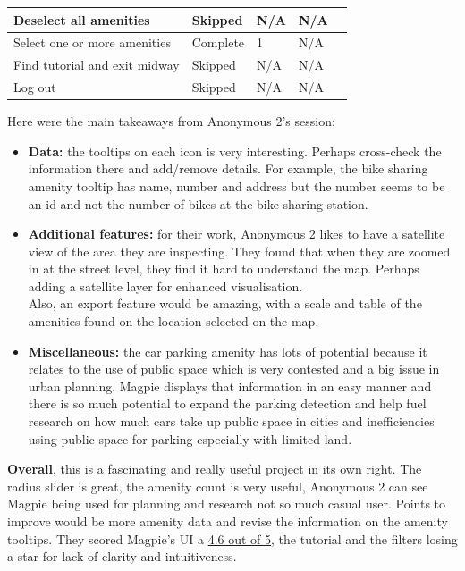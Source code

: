 \begin{table}[h!]
\begin{tabular}{|p{}|p{}|p{}|p{}|p{}|}
        \hline
        Deselect all amenities        & Skipped         & N/A                 & N/A                             \\
        \hline
        Select one or more amenities  & Complete        & 1                   & N/A                             \\
        \hline
        Find tutorial and exit midway & Skipped         & N/A                 & N/A                             \\
        \hline
        Log out                       & Skipped         & N/A                 & N/A                             \\
        \hline
    \end{tabular}
\end{table}

\newpage Here were the main takeaways from Anonymous 2's session:
\begin{itemize}
    \item \textbf{Data:} the tooltips on each icon is very interesting. Perhaps cross-check the information there and add/remove details. For example, the bike sharing amenity tooltip has name, number and address but the number seems to be an id and not the number of bikes at the bike sharing station.\\
    \item \textbf{Additional features:} for their work, Anonymous 2 likes to have a satellite view of the area they are inspecting. They found that when they are zoomed in at the street level, they find it hard to understand the map. Perhaps adding a satellite layer for enhanced visualisation.\\ Also, an export feature would be amazing, with a scale and table of the amenities found on the location selected on the map.\\
    \item \textbf{Miscellaneous:} the car parking amenity has lots of potential because it relates to the use of public space which is very contested and a big issue in urban planning. Magpie displays that information in an easy manner and there is so much potential to expand the parking detection and help fuel research on how much cars take up public space in cities and inefficiencies using public space for parking especially with limited land.
\end{itemize}
\textbf{Overall}, this is a fascinating and really useful project in its own right. The radius slider is great, the amenity count is very useful, Anonymous 2 can see Magpie being used for planning and research not so much casual user. Points to improve would be more amenity data and revise the information on the amenity tooltips. They scored Magpie's UI a \underline{4.6 out of 5}, the tutorial and the filters losing a star for lack of clarity and intuitiveness.
